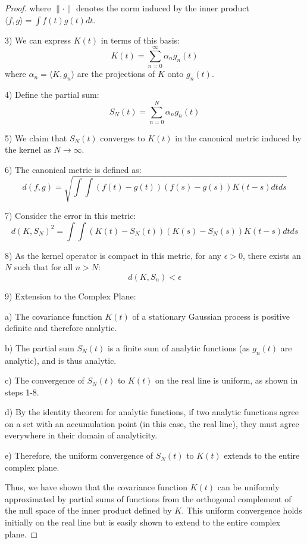 \documentclass{article}
\begin{document}
\begin{proof}
   where $\|\cdot\|$ denotes the norm induced by the inner product $\langle f, g \rangle = \int f(t)g(t)dt$.

3) We can express $K(t)$ in terms of this basis:
   $$K(t) = \sum_{n=0}^{\infty} \alpha_n g_n(t)$$
   where $\alpha_n = \langle K, g_n \rangle$ are the projections of $K$ onto $g_n(t)$.

4) Define the partial sum:
   $$S_N(t) = \sum_{n=0}^N \alpha_n g_n(t)$$

5) We claim that $S_N(t)$ converges to $K(t)$ in the canonical metric induced by the kernel as $N \to \infty$.

6) The canonical metric is defined as:
   $$d(f,g) = \sqrt{\int\int (f(t) - g(t))(f(s) - g(s))K(t-s)dtds}$$

7) Consider the error in this metric:
   $$d(K, S_N)^2 = \int\int (K(t) - S_N(t))(K(s) - S_N(s))K(t-s)dtds$$

8) As the kernel operator is compact in this metric, for any $\epsilon > 0$, there exists an $N$ such that for all $n > N$:
   $$d(K, S_n) < \epsilon$$

9) Extension to the Complex Plane:
   
   a) The covariance function $K(t)$ of a stationary Gaussian process is positive definite and therefore analytic.
   
   b) The partial sum $S_N(t)$ is a finite sum of analytic functions (as $g_n(t)$ are analytic), and is thus analytic.
   
   c) The convergence of $S_N(t)$ to $K(t)$ on the real line is uniform, as shown in steps 1-8.
   
   d) By the identity theorem for analytic functions, if two analytic functions agree on a set with an accumulation point (in this case, the real line), they must agree everywhere in their domain of analyticity.
   
   e) Therefore, the uniform convergence of $S_N(t)$ to $K(t)$ extends to the entire complex plane.

Thus, we have shown that the covariance function $K(t)$ can be uniformly approximated by partial sums of functions from the orthogonal complement of the null space of the inner product defined by $K$. This uniform convergence holds  initially on the real line but is easily shown to extend  to the entire complex plane.
\end{proof}
\end{document}
